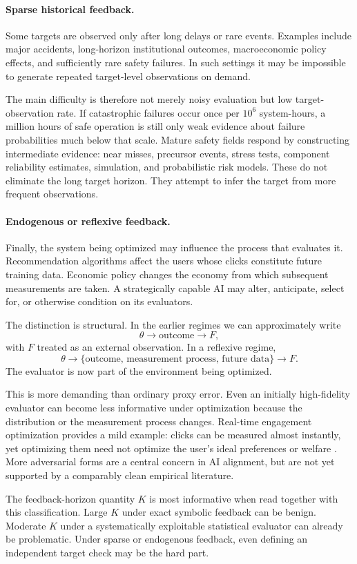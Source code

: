 \paragraph{Sparse historical feedback.}
Some targets are observed only after long delays or rare events.  Examples include
major accidents, long-horizon institutional outcomes, macroeconomic policy effects,
and sufficiently rare safety failures.  In such settings it may be impossible to
generate repeated target-level observations on demand.

The main difficulty is therefore not merely noisy evaluation but low target-observation
rate.  If catastrophic failures occur once per \(10^6\) system-hours, a million
hours of safe operation is still only weak evidence about failure probabilities much
below that scale.  Mature safety fields respond by constructing intermediate evidence:
near misses, precursor events, stress tests, component reliability estimates,
simulation, and probabilistic risk models.  These do not eliminate the long target
horizon.  They attempt to infer the target from more frequent observations.

\paragraph{Endogenous or reflexive feedback.}
Finally, the system being optimized may influence the process that evaluates it.
Recommendation algorithms affect the users whose clicks constitute future training
data.  Economic policy changes the economy from which subsequent measurements are
taken.  A strategically capable AI may alter, anticipate, select for, or otherwise
condition on its evaluators.

The distinction is structural.  In the earlier regimes we can approximately write
\[
    \theta \longrightarrow \text{outcome}
    \longrightarrow F,
\]
with \(F\) treated as an external observation.  In a reflexive regime,
\[
    \theta
    \longrightarrow
    \{\text{outcome},\,\text{measurement process},\,\text{future data}\}
    \longrightarrow F.
\]
The evaluator is now part of the environment being optimized.

This is more demanding than ordinary proxy error.  Even an initially high-fidelity
evaluator can become less informative under optimization because the distribution or
the measurement process changes.  Real-time engagement optimization provides a mild
example: clicks can be measured almost instantly, yet optimizing them need not optimize
the user's ideal preferences or welfare \parencite{khambatta2023ideal}.  More adversarial
forms are a central concern in AI alignment, but are not yet supported by a comparably
clean empirical literature.

The feedback-horizon quantity \(K\) is most informative when read together with this
classification.  Large \(K\) under exact symbolic feedback can be benign.  Moderate
\(K\) under a systematically exploitable statistical evaluator can already be
problematic.  Under sparse or endogenous feedback, even defining an independent
target check may be the hard part.

